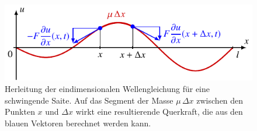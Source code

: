 %
%
%
\begin{figure}
\centering
\includegraphics{chapters/080-feldgleichungen/images/saite.pdf}
\caption{Herleitung der eindimensionalen Wellengleichung für eine
schwingende Saite.
Auf das Segment der Masse $\mu\,\Delta x$ zwischen den Punkten $x$ und
$\Delta x$ wirkt eine resultierende Querkraft, die aus den blauen
Vektoren berechnet werden kann.
\label{buch:feldgleichungen:wellengleichung:fig:saite}}
\end{figure}
